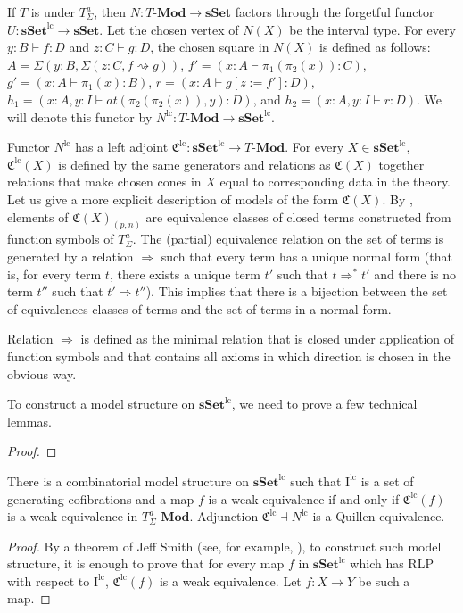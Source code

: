 \documentclass[reqno]{amsart}
\theoremstyle{definition}
\theoremstyle{remark}
\newcommand{\red}{\Rightarrow}
\newcommand{\repl}{:=}
\newcommand{\idtype}{\rightsquigarrow}
\newcommand{\cat}[1]{\mathbf{#1}}
\newcommand{\Mod}[1]{#1\text{-}\cat{Mod}}
\newcommand{\sSet}{\cat{sSet}}
\newcommand{\lc}{lc}
\newcommand{\mlc}{\mathrm{\lc}}
\newcommand{\lcsSet}{\sSet^\mlc}
\newcommand{\lcN}{N^\mlc}
\newcommand{\lcC}{\mathfrak{C}^\mlc}
\newcommand{\lcI}{\I^\mlc}
\newcommand{\I}{\mathrm{I}}
\numberwithin{figure}{section}
\begin{document}
If $T$ is under $T^a_\Sigma$, then $N : \Mod{T} \to \sSet$ factors through the forgetful functor $U : \lcsSet \to \sSet$.
Let the chosen vertex of $N(X)$ be the interval type.
For every $y : B \vdash f : D$ and $z : C \vdash g : D$, the chosen square in $N(X)$ is defined as follows:
$A = \Sigma(y : B, \Sigma(z : C, f \idtype g))$, $f' = (x : A \vdash \pi_1(\pi_2(x)) : C)$, $g' = (x : A \vdash \pi_1(x) : B)$,
$r = (x : A \vdash g[z \repl f'] : D)$, $h_1 = (x : A, y : I \vdash at(\pi_2(\pi_2(x)),y) : D)$, and $h_2 = (x : A, y : I \vdash r : D)$.
We will denote this functor by $\lcN : \Mod{T} \to \lcsSet$.

Functor $\lcN$ has a left adjoint $\lcC : \lcsSet \to \Mod{T}$.
For every $X \in \lcsSet$, $\lcC(X)$ is defined by the same generators and relations as $\mathfrak{C}(X)$
together relations that make chosen cones in $X$ equal to corresponding data in the theory.
Let us give a more explicit description of models of the form $\mathfrak{C}(X)$.
By \cite[Remark~3.4]{alg-models}, elements of $\mathfrak{C}(X)_{(p,n)}$ are equivalence classes of closed terms constructed from function symbols of $T^a_\Sigma$.
The (partial) equivalence relation on the set of terms is generated by a relation $\red$ such that every term has a unique normal form
(that is, for every term $t$, there exists a unique term $t'$ such that $t \red^* t'$ and there is no term $t''$ such that $t' \red t''$).
This implies that there is a bijection between the set of equivalences classes of terms and the set of terms in a normal form.

Relation $\red$ is defined as the minimal relation that is closed under application of function symbols and that contains all axioms in which direction is chosen in the obvious way.

To construct a model structure on $\lcsSet$, we need to prove a few technical lemmas.

\begin{lem}
\end{lem}
\begin{proof}
\end{proof}

\begin{prop}
There is a combinatorial model structure on $\lcsSet$ such that $\lcI$ is a set of generating cofibrations and a map $f$ is a weak equivalence if and only if $\lcC(f)$ is a weak equivalence in $\Mod{T^a_\Sigma}$.
Adjunction $\lcC \dashv \lcN$ is a Quillen equivalence.
\end{prop}
\begin{proof}
By a theorem of Jeff Smith (see, for example, \cite[Proposition~A.2.6.8]{lurie-topos}),
to construct such model structure, it is enough to prove that for every map $f$ in $\lcsSet$ which has RLP with respect to $\lcI$, $\lcC(f)$ is a weak equivalence.
Let $f : X \to Y$ be such a map.
\end{proof}



\end{document}
